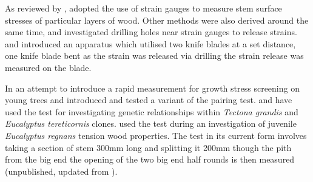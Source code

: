 As reviewed by \cite{kubler_1987}, \cite{Okuyama_1981} adopted the use of strain gauges to measure stem surface
stresses of particular layers of wood. Other methods were also derived around
the same time, \cite{gueneau1973}\cite{gueneau1973b} and \cite{kikata1977} investigated drilling holes near strain gauges to release strains.
\cite{Gueneau1974} and \cite{Saurat_1976} introduced an apparatus which utilised two knife
blades at a set distance, one knife blade bent as the strain was released via
drilling the strain release was measured on the blade. 

In an attempt to introduce a rapid measurement for growth stress screening on young trees \cite{Chauhan_2010} and \cite{Entwistle_2014} introduced and tested a variant of the pairing test. \cite{naranjo2012early} and \cite{Aggarwal_2013} have used the test for investigating genetic relationships within \textit{Tectona grandis} and \textit{Eucalyptus tereticornis} clones. \cite{Chauhan_2011} used the test during an investigation of juvenile \textit{Eucalyptus regnans} tension wood properties. The test in its current form involves taking a section of stem 300mm long and splitting it 200mm though the pith from the big end the opening of the two big end half rounds is then measured (unpublished, updated from \cite{Chauhan_2011}).  